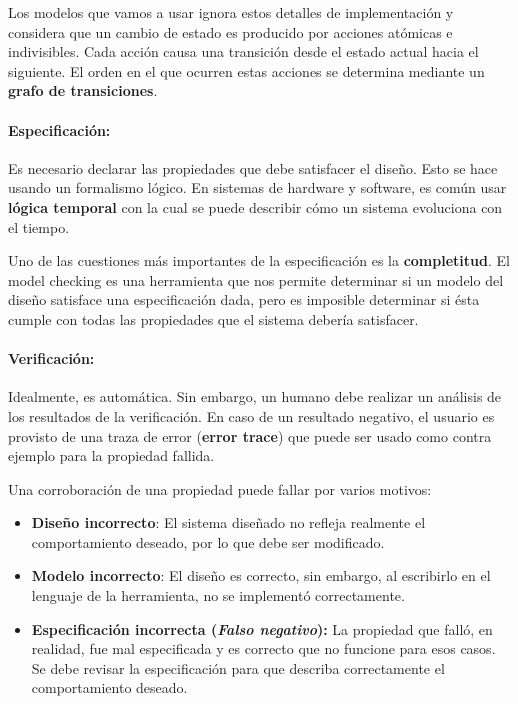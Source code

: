 Los modelos que vamos a usar ignora estos detalles de implementación y considera que un cambio de estado es producido por acciones  atómicas e indivisibles. Cada acción causa una transición desde el estado actual hacia el siguiente. El orden en el que ocurren estas acciones se determina mediante un \textbf{grafo de transiciones}.

\paragraph{Especificación:} Es necesario declarar las propiedades que debe satisfacer el diseño. Esto se hace usando un formalismo lógico. En sistemas de hardware y software, es común usar \textbf{lógica temporal} con la cual se puede describir cómo un sistema evoluciona con el tiempo.

Uno de las cuestiones más importantes de la especificación es la \textbf{completitud}. El model checking es una herramienta que nos permite determinar si un modelo del diseño satisface una especificación dada, pero es imposible determinar si ésta cumple con todas las propiedades que el sistema debería satisfacer.

\paragraph{Verificación:} Idealmente, es automática. Sin embargo, un humano debe realizar un análisis de los resultados de la verificación. En caso de un resultado negativo, el usuario es provisto de una traza de error (\textbf{error trace}) que puede ser usado como contra ejemplo para la propiedad fallida. 

Una corroboración de una propiedad puede fallar por varios motivos: 
\begin{itemize}
\item \textbf{Diseño incorrecto}: El sistema diseñado no refleja realmente el comportamiento deseado, por lo que debe ser modificado.
\item \textbf{Modelo incorrecto}: El diseño es correcto, sin embargo, al escribirlo en el lenguaje de la herramienta, no se implementó correctamente.
\item \textbf{Especificación incorrecta (\textit{Falso negativo}):} La propiedad que falló, en realidad, fue mal especificada y es correcto que no funcione para esos casos. Se debe revisar la especificación para que describa correctamente el comportamiento deseado.
\end{itemize}

